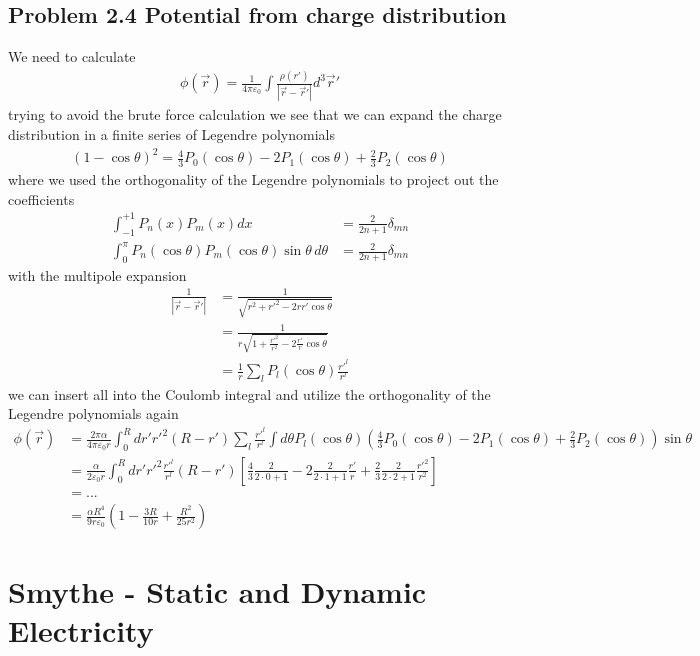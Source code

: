 \documentclass[10pt,a4paper]{book}
\theoremstyle{definition}
\begin{document}
\subsection{Problem 2.4 Potential from charge distribution}
We need to calculate
\begin{align}
\phi(\vec{r})=\frac{1}{4\pi\varepsilon_0}\int\frac{\rho(r')}{|\vec{r}-\vec{r}'|}d^3\vec{r}'
\end{align}
trying to avoid the brute force calculation we see that we can expand the charge distribution in a finite series of Legendre polynomials
\begin{align}
(1-\cos\theta)^2=\frac{4}{3}P_0(\cos\theta)-2P_1(\cos\theta)+\frac{2}{3}P_2(\cos\theta)
\end{align}
where we used the orthogonality of the Legendre polynomials to project out the coefficients 
\begin{align}
\int_{-1}^{+1}P_n(x)P_m(x)dx&=\frac{2}{2n+1}\delta_{mn}\\
\int_{0}^{\pi}P_n(\cos\theta)P_m(\cos\theta)\sin\theta\,d\theta&=\frac{2}{2n+1}\delta_{mn}
\end{align}
with the multipole expansion 
\begin{align}
\frac{1}{|\vec{r}-\vec{r}'|}
&=\frac{1}{\sqrt{r^2+r'^2-2rr'\cos\theta}}\\
&=\frac{1}{r\sqrt{1+\frac{r'^2}{r^2}-2\frac{r'}{r}\cos\theta}}\\
&=\frac{1}{r}\sum_lP_l(\cos\theta)\frac{r'^l}{r^l}
\end{align}
we can insert all into the Coulomb integral and utilize the orthogonality of the Legendre polynomials again
\begin{align}
\phi(\vec{r})
&=\frac{2\pi\alpha}{4\pi\varepsilon_0r}\int_0^R dr'r'^2(R-r')\sum_l\frac{r'^l}{r^l}\int d\theta P_l(\cos\theta)\left(\frac{4}{3}P_0(\cos\theta)-2P_1(\cos\theta)+\frac{2}{3}P_2(\cos\theta)\right)\sin\theta\\
&=\frac{\alpha}{2\varepsilon_0r}\int_0^R dr'r'^2\frac{r'^l}{r^l}(R-r')\left[\frac{4}{3}\frac{2}{2\cdot0+1}-2\frac{2}{2\cdot1+1}\frac{r'}{r}+\frac{2}{3}\frac{2}{2\cdot2+1}\frac{r'^2}{r^2}\right]\\
&=...\\
&=\frac{\alpha R^4}{9r\varepsilon_0}\left(1-\frac{3R}{10r}+\frac{R^2}{25r^2}\right)
\end{align}


\section{{\sc Smythe} - Static and Dynamic Electricity}
\end{document}

